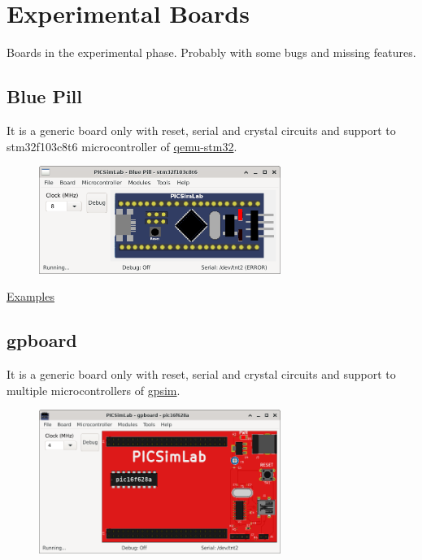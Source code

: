 \chapter{Experimental Boards} \hypertarget{def:eboards}{}

Boards in the experimental phase. Probably with some bugs and missing features. 

\section{Blue Pill}

It is a generic board only with reset, serial and crystal circuits and support to stm32f103c8t6 microcontroller of 
\href{https://beckus.github.io/qemu_stm32/}{qemu-stm32}.

\begin{figure}[H]
\center
\includegraphics[width=0.7\textwidth]{img/Blue_Pill.png} 
\end{figure} 

\href{https://lcgamboa.github.io/picsimlab_examples/board_Blue_Pill.html}{Examples}


\section{gpboard}

It is a generic board only with reset, serial and crystal circuits and support to multiple microcontrollers 
of \href{http://gpsim.sourceforge.net/}{gpsim}.

\begin{figure}[H]
\center
\includegraphics[width=0.7\textwidth]{img/gpboard.png} 
\end{figure} 

